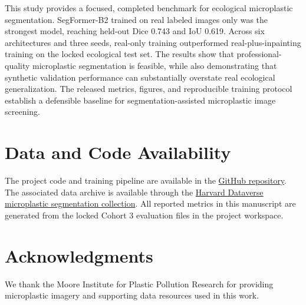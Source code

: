 \documentclass[11pt]{article}
\begin{document}
This study provides a focused, completed benchmark for ecological microplastic segmentation. SegFormer-B2 trained on real labeled images only was the strongest model, reaching held-out Dice 0.743 and IoU 0.619. Across six architectures and three seeds, real-only training outperformed real-plus-inpainting training on the locked ecological test set. The results show that professional-quality microplastic segmentation is feasible, while also demonstrating that synthetic validation performance can substantially overstate real ecological generalization. The released metrics, figures, and reproducible training protocol establish a defensible baseline for segmentation-assisted microplastic image screening.

\section*{Data and Code Availability}

The project code and training pipeline are available in the \href{https://github.com/axel-slid/Microplastic-Segmentation-GAN/tree/main}{GitHub repository}. The associated data archive is available through the \href{https://dataverse.harvard.edu/dataverse/Microplastic-Segmentation-GAN/}{Harvard Dataverse microplastic segmentation collection}. All reported metrics in this manuscript are generated from the locked Cohort 3 evaluation files in the project workspace.

\section*{Acknowledgments}

We thank the Moore Institute for Plastic Pollution Research for providing microplastic imagery and supporting data resources used in this work.
\end{document}
